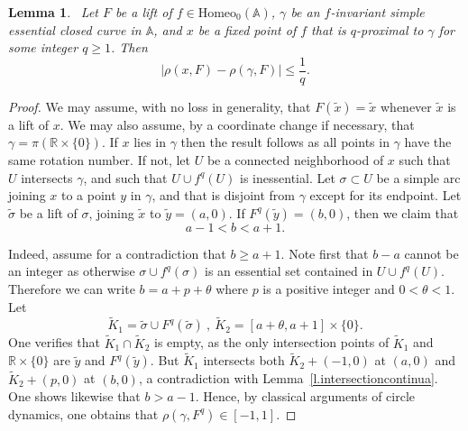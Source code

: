 \documentclass[12pt,a4paper]{amsart}
\newtheorem{lemma}[thm]{Lemma}
\theoremstyle{definition}
\theoremstyle{remark}
\newcommand{\R}{\mathbb{R}}
\newcommand{\A}{\mathbb{A}}
\begin{document}
\begin{lemma}~\label{lemmabpatrice}
Let $F$ be a lift of $f\in\mathrm{Homeo}_0(\A)$, $\gamma$ be an $f$-invariant simple essential closed curve in $\A$, and $x$ be a fixed point of $f$ that is $q$-proximal to $\gamma$ for some integer $q\ge 1$. Then 
$$\mid \rho(x,F)-\rho(\gamma,F)\mid\leq \frac{1}{q}.$$
\end{lemma}
\begin{proof}
We may assume, with no loss in generality, that $F(\tilde x)=\tilde x$ whenever $\tilde x$ is a lift of $x$. We may also assume, by a coordinate change if necessary, that $\gamma=\pi(\R\times\{0\})$. If $x$ lies in $\gamma$ then the result follows as all points in $\gamma$ have the same rotation number. If not, let $U$ be a connected neighborhood of $x$ such that $U$ intersects $\gamma$, and such that $U\cup f^q(U)$ is inessential. Let $\sigma\subset U$ be a simple arc joining $x$ to a point $y$ in $\gamma$, and that is disjoint from $\gamma$ except for its endpoint. Let $\widetilde \sigma$ be a lift of $\sigma$, joining $\widetilde x$ to $\widetilde y=(a,0)$. If $F^q(\widetilde y)=(b,0)$, then we claim that  
$$a-1<b<a+1.$$ 

Indeed, assume for a contradiction that $b\geq a+1$. Note first that $b-a$ cannot be an integer as otherwise $\sigma\cup f^q(\sigma)$ is an essential set contained in  $U\cup f^q(U)$. Therefore we can write $b=a+p+\theta$ where $p$ is a positive integer and $0<\theta<1$. Let 
$$\tilde K_1 = \widetilde\sigma\cup F^q(\widetilde\sigma)\ ,\ \tilde K_2 = [a+\theta, a+1]\times \{0\}.$$ One verifies that  $\widetilde K_1 \cap \widetilde K_2$ is empty, as the only intersection points of $\widetilde K_1$ and $\R\times\{0\}$ are $\widetilde y$ and $F^q(\widetilde y)$. But $\widetilde K_1$ intersects both $\widetilde K_2+(-1,0)$ at $(a,0)$ and  $\widetilde K_2+(p,0)$ at $(b,0)$, a contradiction with Lemma~\ref{l.intersectioncontinua}. One shows likewise that $b>a-1$. Hence, by classical arguments of circle dynamics, one obtains that $\rho(\gamma, F^q)\in[-1,1]$. 
\end{proof}
\end{document}
